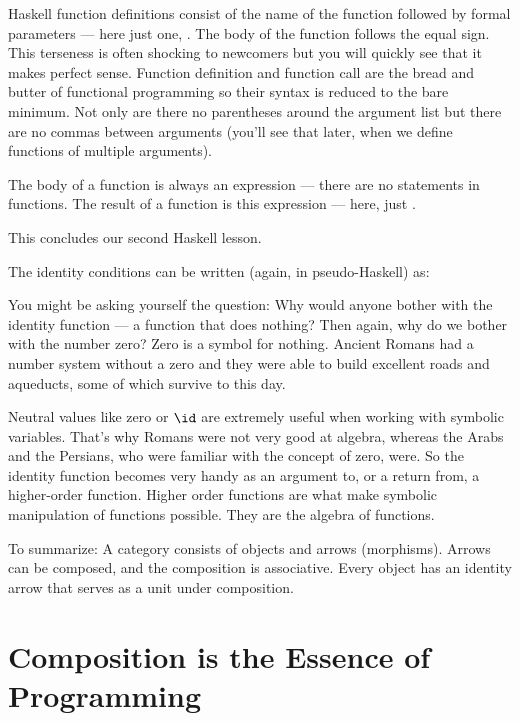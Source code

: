 Haskell function definitions consist of the name of the function
followed by formal parameters --- here just one, . The body of
the function follows the equal sign. This terseness is often shocking to
newcomers but you will quickly see that it makes perfect sense. Function
definition and function call are the bread and butter of functional
programming so their syntax is reduced to the bare minimum. Not only are
there no parentheses around the argument list but there are no commas
between arguments (you'll see that later, when we define functions of
multiple arguments).

The body of a function is always an expression --- there are no
statements in functions. The result of a function is this expression ---
here, just .

This concludes our second Haskell lesson.

The identity conditions can be written (again, in pseudo-Haskell) as:

You might be asking yourself the question: Why would anyone bother with
the identity function --- a function that does nothing? Then again, why
do we bother with the number zero? Zero is a symbol for nothing. Ancient
Romans had a number system without a zero and they were able to build
excellent roads and aqueducts, some of which survive to this day.

Neutral values like zero or $\id$ are extremely useful when
working with symbolic variables. That's why Romans were not very good at
algebra, whereas the Arabs and the Persians, who were familiar with the
concept of zero, were. So the identity function becomes very handy as an
argument to, or a return from, a higher-order function. Higher order
functions are what make symbolic manipulation of functions possible.
They are the algebra of functions.

To summarize: A category consists of objects and arrows (morphisms).
Arrows can be composed, and the composition is associative. Every object
has an identity arrow that serves as a unit under composition.

\section{Composition is the Essence of Programming}

